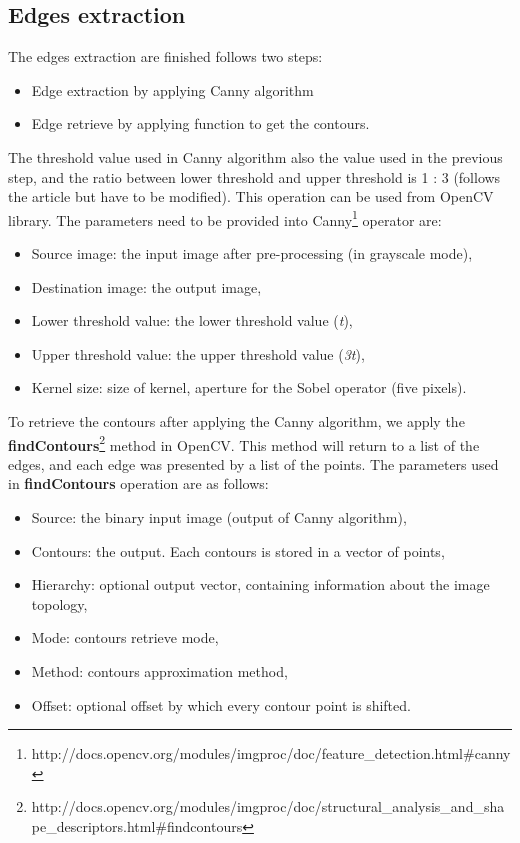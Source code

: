 \subsection{Edges extraction}
The edges extraction are finished follows two steps:
\begin{itemize}
\item Edge extraction by applying Canny algorithm
\item Edge retrieve by applying function to get the contours.
\end{itemize} 
The threshold value used in Canny algorithm also the value used in the previous step, and the ratio between lower threshold and upper threshold is 1 : 3 (follows the article \cite{palaniswamy2010automatic} but have to be modified). This operation can be used from OpenCV library. The parameters need to be provided into Canny\footnote{http://docs.opencv.org/modules/imgproc/doc/feature\_detection.html\#canny} operator are:
\begin{itemize}
\item Source image: the input image after pre-processing (in grayscale mode),
\item Destination image: the output image,
\item Lower threshold value: the lower threshold value (\textit{t}),
\item Upper threshold value: the upper threshold value (\textit{3t}),
\item Kernel size: size of kernel, aperture for the Sobel operator (five pixels).
\end{itemize}
To retrieve the contours after applying the Canny algorithm, we apply the \textbf{findContours}\footnote{http://docs.opencv.org/modules/imgproc/doc/structural\_analysis\_and\_shape\_descriptors.html\#findcontours} method in OpenCV. This method will return to a list of the edges, and each edge was presented by a list of the points. 
The parameters used in \textbf{findContours} operation are as follows:
\begin{itemize}
\item Source: the binary input image (output of Canny algorithm),
\item Contours: the output. Each contours is stored in a vector of points,
\item Hierarchy: optional output vector, containing information about the image topology,
\item Mode: contours retrieve mode,
\item Method: contours approximation method,
\item Offset: optional offset by which every contour point is shifted.
\end{itemize}
